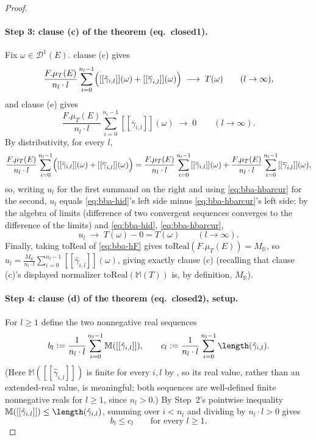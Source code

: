 \begin{proof}
  \paragraph{Step 3: clause (c) of the theorem (eq.~closed1).} Fix $\omega\in\mathcal D^1(E)$.
   clause (c) gives
  \begin{equation}\label{eq:bba-hid}
    \frac{F.\mu_T(E)}{n_l\cdot l}\sum_{i=0}^{n_l-1}\Bigl([[\hat\gamma_{i,l}]](\omega)
      +[[\overline\gamma_{i,l}]](\omega)\Bigr)
    \;\longrightarrow\; T(\omega)
    \qquad(l\to\infty)
    ,
  \end{equation}
  and  clause (e) gives
  \begin{equation}\label{eq:bba-hbarcur}
    \frac{F.\mu_T(E)}{n_l\cdot l}\sum_{i=0}^{n_l-1}[[\overline\gamma_{i,l}]](\omega)
    \;\longrightarrow\; 0
    \qquad(l\to\infty)
    .
  \end{equation}
  By distributivity, for every $l$,
  \[
    \frac{F.\mu_T(E)}{n_l\cdot l}\sum_{i=0}^{n_l-1}\Bigl([[\hat\gamma_{i,l}]](\omega)
      +[[\overline\gamma_{i,l}]](\omega)\Bigr)
    =
    \frac{F.\mu_T(E)}{n_l\cdot l}\sum_{i=0}^{n_l-1}[[\hat\gamma_{i,l}]](\omega)
    +
    \frac{F.\mu_T(E)}{n_l\cdot l}\sum_{i=0}^{n_l-1}[[\overline\gamma_{i,l}]](\omega)
    ,
  \]
  so, writing $u_l$ for the first summand on the right and using \eqref{eq:bba-hbarcur} for the
  second, $u_l$ equals \eqref{eq:bba-hid}'s left side minus \eqref{eq:bba-hbarcur}'s left side; by
  the algebra of limits (difference of two convergent sequences converges to the difference of the
  limits) and \eqref{eq:bba-hid}, \eqref{eq:bba-hbarcur},
  \[
    u_l \;\longrightarrow\; T(\omega) - 0 = T(\omega)
    \qquad(l\to\infty)
    .
  \]
  Finally, taking $\mathrm{toReal}$ of \eqref{eq:bba-hF} gives
  $\mathrm{toReal}(F.\mu_T(E)) = M_{\mathbb R}$, so $u_l = \frac{M_{\mathbb R}}{n_l\cdot l}
  \sum_{i=0}^{n_l-1}[[\hat\gamma_{i,l}]](\omega)$, giving exactly clause (c) (recalling that clause
  (c)'s displayed normalizer $\mathrm{toReal}(\mathbb M(T))$ is, by definition, $M_{\mathbb R}$).

  \paragraph{Step 4: clause (d) of the theorem (eq.~closed2), setup.} For $l\ge1$ define the two
  nonnegative real sequences
  \[
    b_l := \frac1{n_l\cdot l}\sum_{i=0}^{n_l-1}\mathbb M([[\hat\gamma_{i,l}]])
    ,
    \qquad
    c_l := \frac1{n_l\cdot l}\sum_{i=0}^{n_l-1}\length(\hat\gamma_{i,l})
    .
  \]
  (Here $\mathbb M([[\hat\gamma_{i,l}]])$ is finite for every $i,l$ by ,
  so its real value, rather than an extended-real value, is meaningful; both sequences are
  well-defined finite nonnegative reals for $l\ge1$, since $n_l>0$.) By Step~2's pointwise
  inequality $\mathbb M([[\hat\gamma_{i,l}]])\le\length(\hat\gamma_{i,l})$, summing over $i<n_l$
  and dividing by $n_l\cdot l>0$ gives
  \begin{equation}\label{eq:bba-ble}
    b_l \le c_l \qquad\text{for every } l\ge1
    . \tag{$\ast$}
  \end{equation}


\end{proof}

